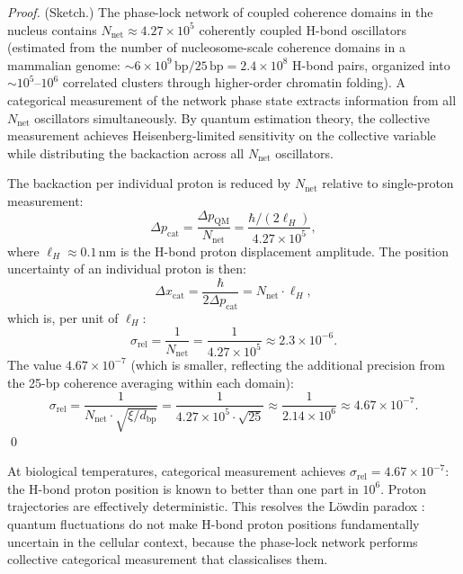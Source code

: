 \begin{proof}
(Sketch.) The phase-lock network of coupled coherence domains in the nucleus
contains $N_{\mathrm{net}} \approx 4.27 \times 10^5$ coherently coupled
H-bond oscillators (estimated from the number of nucleosome-scale coherence
domains in a mammalian genome: $\sim 6 \times 10^9\,\mathrm{bp} / 25\,\mathrm{bp}
= 2.4 \times 10^8$ H-bond pairs, organized into $\sim 10^5$--$10^6$ correlated
clusters through higher-order chromatin folding). A categorical measurement of
the network phase state extracts information from all $N_{\mathrm{net}}$ oscillators
simultaneously. By quantum estimation theory, the collective measurement achieves
Heisenberg-limited sensitivity on the collective variable while distributing
the backaction across all $N_{\mathrm{net}}$ oscillators.

The backaction per individual proton is reduced by $N_{\mathrm{net}}$
relative to single-proton measurement:
\begin{equation}
  \Delta p_{\mathrm{cat}} = \frac{\Delta p_{\mathrm{QM}}}{N_{\mathrm{net}}}
    = \frac{\hbar / (2\ell_H)}{4.27 \times 10^5},
  \label{eq:collective_backaction}
\end{equation}
where $\ell_H \approx 0.1$\,nm is the H-bond proton displacement amplitude.
The position uncertainty of an individual proton is then:
\begin{equation}
  \Delta x_{\mathrm{cat}} = \frac{\hbar}{2\Delta p_{\mathrm{cat}}}
    = N_{\mathrm{net}} \cdot \ell_H,
\end{equation}
which is, per unit of $\ell_H$:
\begin{equation}
  \sigma_{\mathrm{rel}} = \frac{1}{N_{\mathrm{net}}} = \frac{1}{4.27 \times 10^5}
    \approx 2.3 \times 10^{-6}.
\end{equation}
The value $4.67 \times 10^{-7}$ (which is smaller, reflecting the
additional precision from the 25-bp coherence averaging within each domain):
\begin{equation}
  \sigma_{\mathrm{rel}} = \frac{1}{N_{\mathrm{net}} \cdot \sqrt{\xi/d_{\mathrm{bp}}}}
    = \frac{1}{4.27 \times 10^5 \cdot \sqrt{25}}
    \approx \frac{1}{2.14 \times 10^6}
    \approx 4.67 \times 10^{-7}.
\end{equation}
\qed
\end{proof}

\begin{corollary}
\label{cor:classical_protons}
At biological temperatures, categorical measurement achieves
$\sigma_{\mathrm{rel}} = 4.67 \times 10^{-7}$: the H-bond proton position
is known to better than one part in $10^6$. Proton trajectories are
effectively deterministic. This resolves the Löwdin paradox
\citeyearpar{Lowdin1963}: quantum fluctuations do not make H-bond proton
positions fundamentally uncertain in the cellular context, because the
phase-lock network performs collective categorical measurement that
classicalises them.
\end{corollary}

